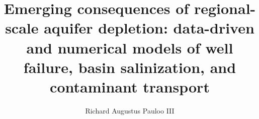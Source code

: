 


\title{Emerging consequences of regional-scale aquifer depletion: data-driven and numerical models of well failure, basin salinization, and contaminant transport}

\author{Richard Augustus Pauloo III}









